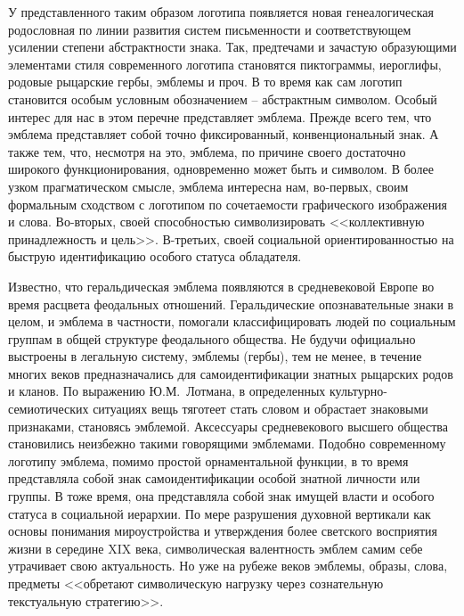 У представленного таким образом логотипа появляется новая генеалогическая
родословная по линии развития систем письменности и соответствующем усилении
степени абстрактности знака. Так, предтечами и зачастую образующими элементами
стиля современного логотипа становятся пиктограммы, иероглифы, родовые рыцарские
гербы, эмблемы и проч. В то время как сам логотип становится особым условным обозначением --
абстрактным символом. Особый интерес для нас в этом перечне представляет эмблема.
Прежде всего тем, что эмблема представляет собой точно фиксированный,
конвенциональный знак. А также тем, что, несмотря на это, эмблема, по причине своего
достаточно широкого функционирования, одновременно может быть и символом.\autocite[][268]{losev1976}
В более узком прагматическом смысле, эмблема интересна нам, во-первых,
своим формальным сходством с логотипом по сочетаемости графического изображения и слова.
Во-вторых, своей способностью символизировать <<коллективную принадлежность и цель>>.\autocite[][14]{elbrunn2003}
В-третьих, своей социальной ориентированностью на быструю идентификацию особого статуса обладателя.

Известно, что геральдическая эмблема появляются в средневековой Европе во время
расцвета феодальных отношений. Геральдические опознавательные знаки в целом, и
эмблема в частности, помогали классифицировать людей по социальным группам в
общей структуре феодального общества. Не будучи официально выстроены в легальную
систему, эмблемы (гербы), тем не менее, в течение многих веков предназначались для
самоидентификации знатных рыцарских родов и кланов. По выражению Ю.М.~Лотмана, в
определенных культурно-семиотических ситуациях вещь тяготеет стать словом и
обрастает знаковыми признаками, становясь эмблемой.\autocite[][341-342]{lotman2002}
Аксессуары средневекового высшего общества становились неизбежно такими говорящими эмблемами.
Подобно современному логотипу эмблема, помимо простой орнаментальной функции,
в то время представляла собой знак самоидентификации особой знатной личности или
группы. В тоже время, она представляла собой знак имущей власти и особого
статуса в социальной иерархии. По мере разрушения духовной вертикали как основы
понимания мироустройства и утверждения более светского восприятия жизни в середине
XIX века, символическая валентность эмблем самим себе утрачивает свою актуальность.
Но уже на рубеже веков эмблемы, образы, слова, предметы <<обретают символическую
нагрузку через сознательную текстуальную стратегию>>.\autocite{rebekkini2006}


